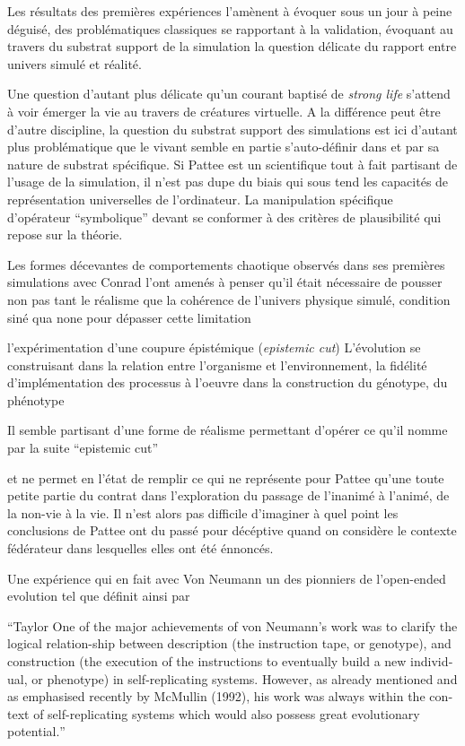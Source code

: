 
Les résultats des premières expériences l'amènent à évoquer sous un jour à peine déguisé, des problématiques classiques se rapportant à la validation, évoquant au travers du substrat support de la simulation la question délicate du rapport entre univers simulé et réalité. 

Une question d'autant plus délicate qu'un courant baptisé de \textit{strong life} s'attend à voir émerger la vie au travers de créatures virtuelle. A la différence peut être d'autre discipline, la question du substrat support des simulations est ici d'autant plus problématique que le vivant semble en partie s'auto-définir dans et par sa nature de substrat spécifique. Si Pattee est un scientifique tout à fait partisant de l'usage de la simulation, il n'est pas dupe du biais qui sous tend les capacités de représentation universelles de l'ordinateur. La manipulation spécifique d'opérateur \enquote{symbolique} devant se conformer à des critères de plausibilité qui repose sur la théorie. 


Les formes décevantes de comportements chaotique observés dans ses premières simulations avec Conrad l'ont amenés à penser qu'il était nécessaire de pousser non pas tant le réalisme que la cohérence de l'univers physique simulé, condition siné qua none pour dépasser cette limitation

l'expérimentation d'une coupure épistémique (\textit{epistemic cut}) L'évolution se construisant dans la relation entre l'organisme et l'environnement, la fidélité d'implémentation des processus à l'oeuvre dans la construction du génotype, du phénotype 

Il semble partisant d'une forme de réalisme permettant d'opérer ce qu'il nomme par la suite \enquote{epistemic cut}

et ne permet en l'état de remplir ce qui ne représente pour Pattee qu'une toute petite partie du contrat dans l'exploration du passage de l'inanimé à l'animé, de la non-vie à la vie. Il n'est alors pas difficile d'imaginer à quel point les conclusions de Pattee ont du passé pour décéptive quand on considère le contexte fédérateur dans lesquelles elles ont été énnoncés.

Une expérience qui en fait avec Von Neumann un des pionniers de l'open-ended evolution tel que définit ainsi par \autocites{Taylor1999,Taylor2012}  

\foreignquote{english}{Taylor One of the major achievements of von Neumann’s work was to clarify the logical relation-ship between description (the instruction tape, or genotype), and construction (the execution of the instructions to eventually build a new individual, or phenotype) in self-replicating systems. However, as already mentioned and as emphasised recently by McMullin (1992), his work was always within the context of self-replicating systems which would also possess great evolutionary potential.}


